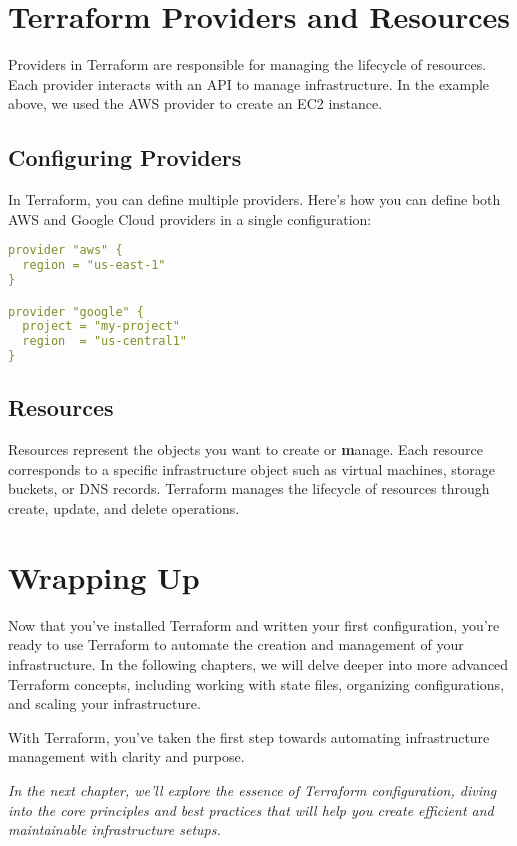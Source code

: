 \section{Terraform Providers and Resources}

Providers in Terraform are responsible for managing the lifecycle of resources. Each provider interacts with an API to manage infrastructure. In the example above, we used the AWS provider to create an EC2 instance.

\subsection{Configuring Providers}

In Terraform, you can define multiple providers. Here's how you can define both AWS and Google Cloud providers in a single configuration:

\begin{lstlisting}[language=yaml]
provider "aws" {
  region = "us-east-1"
}

provider "google" {
  project = "my-project"
  region  = "us-central1"
}
\end{lstlisting}

\subsection{Resources}

Resources represent the objects you want to create or \textbf{m}anage. Each resource corresponds to a specific infrastructure object such as virtual machines, storage buckets, or DNS records. Terraform manages the lifecycle of resources through create, update, and delete operations.

\section{Wrapping Up}

Now that you've installed Terraform and written your first configuration, you're ready to use Terraform to automate the creation and management of your infrastructure. In the following chapters, we will delve deeper into more advanced Terraform concepts, including working with state files, organizing configurations, and scaling your infrastructure.

With Terraform, you've taken the first step towards automating infrastructure management with clarity and purpose.

\vspace{1em}

\textit{In the next chapter, we'll explore the essence of Terraform configuration, diving into the core principles and best practices that will help you create efficient and maintainable infrastructure setups.}
